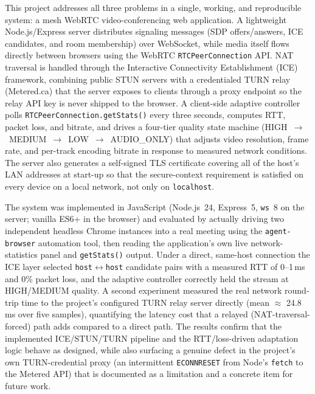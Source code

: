 \documentclass[12pt,a4paper]{report}
\begin{document}
This project addresses all three problems in a single, working, and reproducible system: a
mesh WebRTC video-conferencing web application. A lightweight Node.js/Express server
distributes signaling messages (SDP offers/answers, ICE candidates, and room membership)
over WebSocket, while media itself flows directly between browsers using the WebRTC
\texttt{RTCPeerConnection} API. NAT traversal is handled through the Interactive
Connectivity Establishment (ICE) framework, combining public STUN servers with a
credentialed TURN relay (Metered.ca) that the server exposes to clients through a proxy
endpoint so the relay API key is never shipped to the browser. A client-side adaptive
controller polls \texttt{RTCPeerConnection.getStats()} every three seconds, computes RTT,
packet loss, and bitrate, and drives a four-tier quality state machine
(HIGH~$\rightarrow$~MEDIUM~$\rightarrow$~LOW~$\rightarrow$~AUDIO\_ONLY) that adjusts video
resolution, frame rate, and per-track encoding bitrate in response to measured network
conditions. The server also generates a self-signed TLS certificate covering all of the
host's LAN addresses at start-up so that the secure-context requirement is satisfied on
every device on a local network, not only on \texttt{localhost}.

The system was implemented in JavaScript (Node.js~24, Express~5, \texttt{ws}~8 on the
server; vanilla ES6+ in the browser) and evaluated by actually driving two independent
headless Chrome instances into a real meeting using the \texttt{agent-browser} automation
tool, then reading the application's own live network-statistics panel and
\texttt{getStats()} output. Under a direct, same-host connection the ICE layer selected
\texttt{host}$\leftrightarrow$\texttt{host} candidate pairs with a measured RTT of
0--1\,ms and 0\% packet loss, and the adaptive controller correctly held the stream at
HIGH/MEDIUM quality. A second experiment measured the real network round-trip time to the
project's configured TURN relay server directly (mean $\approx$ 24.8\,ms over five
samples), quantifying the latency cost that a relayed (NAT-traversal-forced) path adds
compared to a direct path. The results confirm that the implemented ICE/STUN/TURN pipeline
and the RTT/loss-driven adaptation logic behave as designed, while also surfacing a genuine
defect in the project's own TURN-credential proxy (an intermittent \texttt{ECONNRESET}
from Node's \texttt{fetch} to the Metered API) that is documented as a limitation and a
concrete item for future work.

\end{document}
